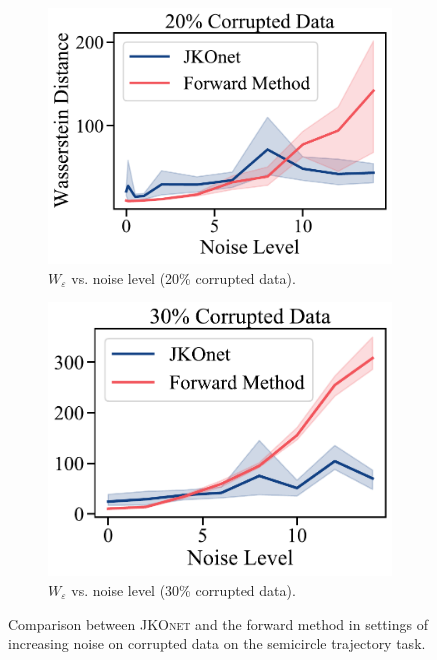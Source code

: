 \begin{figure}[t]
     \begin{subfigure}[t]{0.485\textwidth}
         \centering
         \caption{$W_\varepsilon$ vs. noise level (20\% corrupted data).}
         \includegraphics[width=\textwidth]{figures/fig_fb_comp_noise_20.pdf}
     \end{subfigure}
     \hfill
     \begin{subfigure}[t]{0.46\textwidth}
         \centering
         \caption{$W_\varepsilon$ vs. noise level (30\% corrupted data).}
         \includegraphics[width=\textwidth]{figures/fig_fb_comp_noise_30.pdf}
     \end{subfigure}
     \caption{Comparison between \textsc{JKOnet} and the forward method in settings of increasing noise on corrupted data on the semicircle trajectory task.}
     \label{fig:exp_comp_noise}
\end{figure}

